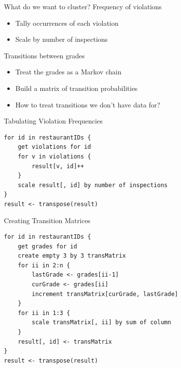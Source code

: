 \documentclass[12pt]{beamer}
\begin{document}
\begin{frame}{What do we want to cluster?}
\vfill
Frequency of violations
\begin{itemize}
	\item Tally occurrences of each violation
	\item Scale by number of inspections
\end{itemize}
\vfill
Transitions between grades
\begin{itemize}
	\item Treat the grades as a Markov chain
	\item Build a matrix of transition probabilities
	\item How to treat transitions we don't have data for?
\end{itemize}
\vfill
\end{frame}

\begin{frame}[fragile]{Tabulating Violation Frequencies}
\vfill
\begin{small}
\begin{lstlisting}
for id in restaurantIDs {
    get violations for id
    for v in violations {
        result[v, id]++
    }
    scale result[, id] by number of inspections
}
result <- transpose(result)
\end{lstlisting}
\end{small}
\vfill
\end{frame}

\begin{frame}[fragile]{Creating Transition Matrices}
\vfill
\begin{footnotesize}
\begin{lstlisting}
for id in restaurantIDs {
    get grades for id
    create empty 3 by 3 transMatrix
    for ii in 2:n {
        lastGrade <- grades[ii-1]
        curGrade <- grades[ii]
        increment transMatrix[curGrade, lastGrade]
    }
    for ii in 1:3 {
        scale transMatrix[, ii] by sum of column
    }
    result[, id] <- transMatrix
}
result <- transpose(result)
\end{lstlisting}
\end{footnotesize}
\vfill
\end{frame}
\end{document}
